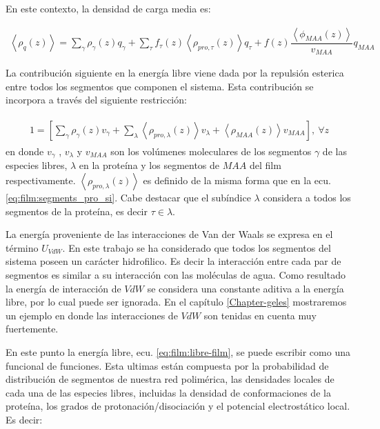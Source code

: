 En este contexto, la densidad de carga media es:

\begin{align}
	\left<\rho_q(z)\right> = \sum_{\gamma } {\rho_\gamma(z) q_\gamma + \sum_\tau{f_\tau(z) \left<\rho_{pro,\tau}(z)\right> q_\tau} +  f(z)\dfrac{\left<\phi_{MAA}(z)\right>}{v_{MAA}}q_{MAA}}
	\label{eq:film:rho_charge}
\end{align}

La contribuci\'on siguiente en la energ\'ia libre viene dada por la repulsi\'on esterica entre  todos los segmentos que componen  el sistema. Esta contribuci\'on se incorpora a trav\'es del siguiente restricci\'on:  

\begin{align}
	\begin{aligned}
		1=  {\left[\sum_{\gamma}\rho_\gamma(z) v_\gamma + \sum_\lambda{\left<\rho_{pro,\lambda}(z)\right>v_\lambda} + \left<\rho_{MAA}(z)\right>v_{MAA} \right]},~ \forall z
	\end{aligned}
	\label{eq:film:constraint}
\end{align}
\noindent en donde $v_\gamma$ , $v_\lambda$ y $v_{MAA}$ son los vol\'umenes moleculares de los segmentos $\gamma$ de las especies libres, $\lambda$  en la prote\'ina y los segmentos de $MAA$ del film respectivamente.
$\left<\rho_{pro,\lambda}(z)\right>$ es definido de la misma forma que en la ecu.  \ref{eq:film:segments_pro_si}.
Cabe destacar que el sub\'indice $\lambda$ considera a todos los segmentos de la prote\'ina, es decir $ \tau \in \lambda$.

La energ\'ia proveniente de las interacciones de Van der Waals se expresa en el t\'ermino $U_{VdW}$. En este trabajo se ha considerado que todos los segmentos del sistema poseen un car\'acter hidrofilico. Es decir la interacci\'on entre cada par de segmentos es similar a su interacci\'on con las mol\'eculas de agua. Como resultado la energ\'ia de interacci\'on de $VdW$ se considera una constante aditiva a la energ\'ia libre, por lo cual puede ser ignorada. En el cap\'itulo \ref{Chapter-geles} mostraremos un ejemplo en donde las interacciones de $VdW$ son tenidas en cuenta muy fuertemente. 

En este punto la energ\'ia libre, ecu. \ref{eq:film:libre-film}, se puede escribir como una funcional de funciones. Esta ultimas est\'an compuesta por la probabilidad de distribuci\'on de segmentos de nuestra red polim\'erica, las densidades locales de cada una de las especies libres, incluidas la densidad de conformaciones de la prote\'ina, los grados de protonaci\'on/disociaci\'on y el potencial electrost\'atico local. Es decir:

